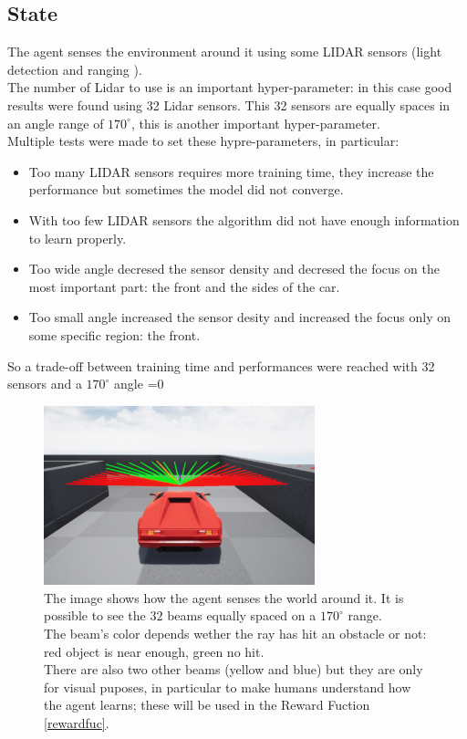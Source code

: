 \documentclass[14pt]{extarticle}
\def\sp{\vspace{5pt}}
\newcounter{debug}
\begin{document}
\begin{flushleft}
	\subsection{State}
	\sp
	The agent senses the environment around it using some LIDAR sensors (light detection and ranging \cite{Lidar}). \\
	The number of Lidar to use is an important hyper-parameter: in this case good results were found using 32 Lidar sensors. This 32 sensors are equally spaces in an angle range of $170^{\circ}$, this is another important hyper-parameter. \\
	Multiple tests were made to set these hypre-parameters, in particular:
	\begin{itemize}
	\item Too many LIDAR sensors requires more training time, they increase the performance but sometimes the model did not converge.
	\item With too few LIDAR sensors the algorithm did not have enough information to learn properly.
	\item Too wide angle decresed the sensor density and decresed the focus on the most important part: the front and the sides of the car.
	\item Too small angle increased the sensor desity and increased the focus only on some specific region: the front.
	\end{itemize}
	So a trade-off between training time and performances were reached with 32 sensors and a $170^{\circ}$ angle
	\ifnum\value{debug}=0 {
	\begin{figure}[H]
    		\centering\includegraphics[width=0.7\textwidth]{./Image/State/carSensors.png}
		\vspace{5mm}
		\caption{The image shows how the agent senses the world around it. It is possible to see the $32$ beams equally spaced on a $170^{\circ}$ range. \\
		The beam's color depends wether the ray has hit an obstacle or not: red object is near enough, green no hit. \\
		There are also two other beams (yellow and blue) but they are only for visual puposes, in particular to make humans understand how the agent learns; these will be used in the Reward Fuction \ref{rewardfuc}.}
	\end{figure}
	}\fi
	

\end{flushleft}
\end{document}
